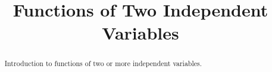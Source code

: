 \documentclass{ximera}
\title{Functions of Two Independent Variables}
\begin{document}
\begin{abstract}
Introduction to functions of two or more independent variables.
\end{abstract}
\maketitle
\end{document}
